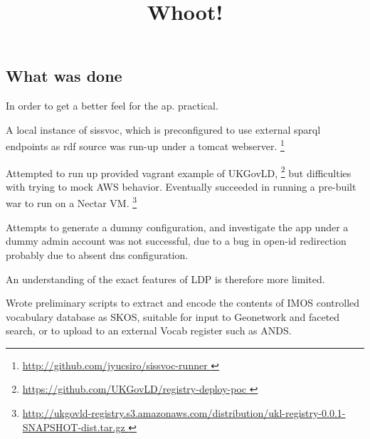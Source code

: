\documentclass[10pt,a4paper]{article}
\title{Whoot!}
\date{}
\newenvironment{italicquotes}
{\begin{quote}\itshape}
{\end{quote}}
\let\Item\item
\newcommand\SpecialItem{\renewcommand\item[1][]{\Item[\textbullet~\bfseries##1]}}
\begin{document}
\SpecialItem

  \maketitle
    \begin{flushleft}
  \setlength{\parindent}{5ex}

% 
% 



\section{
  What was done
}

  In order to get a better feel for the ap. practical. 

  \item[] A local instance of sissvoc, which is preconfigured to use
  external sparql endpoints as rdf source was run-up under a tomcat webserver.
  \footnote{ \url { http://github.com/jyucsiro/sissvoc-runner }  } 

  \item[] Attempted to run up provided vagrant example of UKGovLD, 
  \footnote{ \url { https://github.com/UKGovLD/registry-deploy-poc } } but
  difficulties with trying to mock AWS behavior. Eventually succeeded in running a pre-built war 
  to run on a Nectar VM. 
  \footnote{ \url { 
  http://ukgovld-registry.s3.amazonaws.com/distribution/ukl-registry-0.0.1-SNAPSHOT-dist.tar.gz
  }}

  Attempts to generate a dummy configuration, and investigate the app under a
	dummy admin account was not successful, due to a bug in open-id redirection probably
  due to absent dns configuration.

  An understanding of the exact features of LDP is therefore more limited.

  \item[] 
  Wrote preliminary scripts to extract and encode the contents of IMOS
  controlled vocabulary database as SKOS, suitable for input to Geonetwork 
  and faceted search, or to upload to an external Vocab register such as ANDS.




\end{flushleft}
\end{document}
